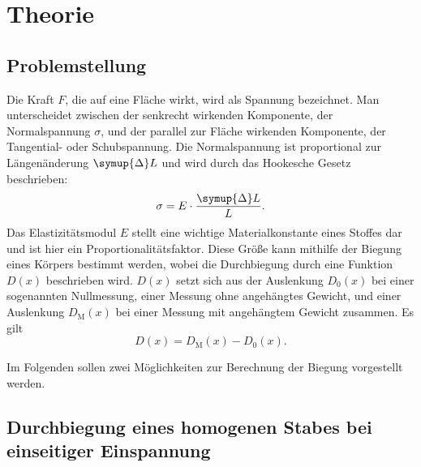 \section{Theorie} \label{sec:theorie}

\subsection{Problemstellung} \label{sec:problem}

    Die Kraft $F$, die auf eine Fläche wirkt, wird als Spannung bezeichnet.
    Man unterscheidet zwischen der senkrecht wirkenden Komponente, der Normalspannung $\sigma$,
    und der parallel zur Fläche wirkenden Komponente, der Tangential- oder Schubspannung.
    Die Normalspannung ist proportional zur Längenänderung $\symup{\Delta}L$ und wird
    durch das Hookesche Gesetz beschrieben:
    \begin{equation}
        \sigma = E \cdot \frac{\symup{\Delta}L}{L} .
    \end{equation}
    Das Elastizitätsmodul $E$ stellt eine wichtige Materialkonstante eines Stoffes dar und 
    ist hier ein Proportionalitätsfaktor.
    Diese Größe kann mithilfe der Biegung eines Körpers bestimmt werden, 
    wobei die Durchbiegung durch eine Funktion $D(x)$ beschrieben wird.
    $D(x)$ setzt sich aus der Auslenkung $D_0(x)$ bei einer sogenannten Nullmessung, 
    einer Messung ohne angehängtes Gewicht, und einer Auslenkung $D_\text{M}(x)$  bei einer
    Messung mit angehängtem Gewicht zusammen.
    Es gilt
    \begin{equation}
        D(x) = D_\text{M}(x) - D_0(x) .
    \end{equation}

    Im Folgenden sollen zwei Möglichkeiten zur Berechnung der Biegung vorgestellt werden.

\subsection{Durchbiegung eines homogenen Stabes bei einseitiger Einspannung} \label{sec:einseitig}


